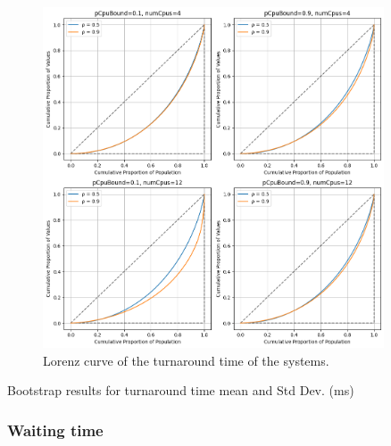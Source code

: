 \begin{figure}[H]
    \captionsetup{type=figure}
    \centering
    \includegraphics[width=0.9\textwidth]{./images/04/sjf/turn/lorenz.png}
    \caption{Lorenz curve of the turnaround time of the systems.}
    \label{fig:sjfTurnLorenz}
\end{figure}


\begin{table}[H]
    \centering
    \scriptsize
    
    \caption{Bootstrap results for turnaround time mean and Std Dev. (ms)}
    \label{tab:sjfTurn}
\end{table}


\subsubsection{Waiting time}


